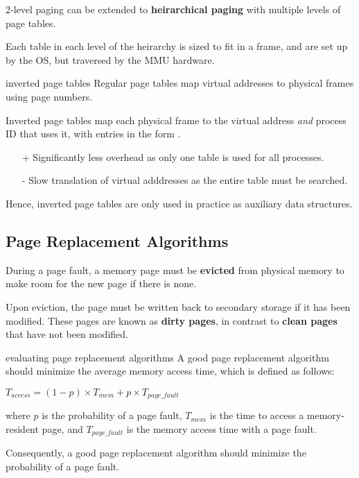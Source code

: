 2-level paging can be extended to \textbf{heirarchical paging} with multiple levels of page tables.

Each table in each level of the heirarchy is sized to fit in a frame, and are set up by the OS, but traversed by the MMU hardware.

\begin{defn}{inverted page tables}
    Regular page tables map virtual addresses to physical frames using page numbers.

    Inverted page tables map each physical frame to the virtual address \textit{and} process ID that uses it, with entries in the form .

    \begin{itemize}
        \item[+] Significantly less overhead as only one table is used for all processes.
        \item[-] Slow translation of virtual adddresses as the entire table must be searched.
    \end{itemize}

    Hence, inverted page tables are only used in practice as auxiliary data structures.
\end{defn}


\subsection{Page Replacement Algorithms}
During a page fault, a memory page must be \textbf{evicted} from physical memory to make room for the new page if there is none.

Upon eviction, the page must be written back to secondary storage if it has been modified.
These pages are known as \textbf{dirty pages}, in contrast to \textbf{clean pages} that have not been modified.

\begin{defn}{evaluating page replacement algorithms}
    A good page replacement algorithm should minimize the average memory access time, which is defined as follows:

    $
        T_{access} = (1 - p) \times T_{mem} + p \times T_{page\_fault}
    $

    where $p$ is the probability of a page fault, $T_{mem}$ is the time to access a memory-resident page, and $T_{page\_fault}$ is the memory access time with a page fault.

    Consequently, a good page replacement algorithm should minimize the probability of a page fault.
\end{defn}

